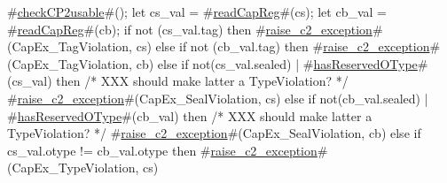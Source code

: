 #\hyperref[sailMIPSzcheckCP2usable]{checkCP2usable}#();
let cs_val = #\hyperref[sailMIPSzreadCapReg]{readCapReg}#(cs);
let cb_val = #\hyperref[sailMIPSzreadCapReg]{readCapReg}#(cb);
if not (cs_val.tag) then
  #\hyperref[sailMIPSzraisezyc2zyexception]{raise\_c2\_exception}#(CapEx_TagViolation, cs)
else if not (cb_val.tag) then
  #\hyperref[sailMIPSzraisezyc2zyexception]{raise\_c2\_exception}#(CapEx_TagViolation, cb)
else if not(cs_val.sealed) | #\hyperref[sailMIPSzhasReservedOType]{hasReservedOType}#(cs_val) then /* XXX should make latter a TypeViolation? */
  #\hyperref[sailMIPSzraisezyc2zyexception]{raise\_c2\_exception}#(CapEx_SealViolation, cs)
else if not(cb_val.sealed) | #\hyperref[sailMIPSzhasReservedOType]{hasReservedOType}#(cb_val) then  /* XXX should make latter a TypeViolation? */
  #\hyperref[sailMIPSzraisezyc2zyexception]{raise\_c2\_exception}#(CapEx_SealViolation, cb)
else if cs_val.otype != cb_val.otype then
  #\hyperref[sailMIPSzraisezyc2zyexception]{raise\_c2\_exception}#(CapEx_TypeViolation, cs)
